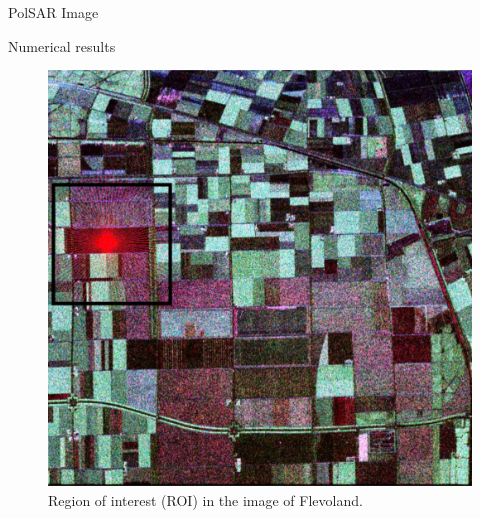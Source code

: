 \documentclass[10pt]{beamer}
\begin{document}




\begin{frame}[fragile]{PolSAR Image}
\begin{alertblock}{Numerical results}
	\begin{figure}[hbt]
\centering
	\includegraphics[width=.5\linewidth]{flevoland_radial_4_look_black}
	\caption{Region of interest (ROI) in the image of Flevoland.}
\label{flevoland_radial_4look}
\end{figure}
\end{alertblock}
\end{frame}
\end{document}
